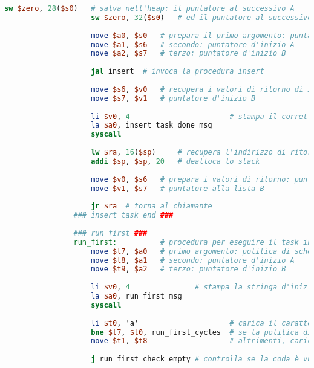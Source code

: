 \begin{center}
\begin{lstlisting}[language=mips, gobble=14, stepnumber=1]
                    sw $zero, 28($s0)	# salva nell'heap: il puntatore al successivo A
                    sw $zero, 32($s0)	# ed il puntatore al successivo B
                    
                    move $a0, $s0	# prepara il primo argomento: puntatore al task appena creato (da inserire)
                    move $a1, $s6	# secondo: puntatore d'inizio A
                    move $a2, $s7	# terzo: puntatore d'inizio B
                    
                    jal insert	# invoca la procedura insert
                    
                    move $s6, $v0	# recupera i valori di ritorno di insert: puntatore d'inizio A
                    move $s7, $v1	# puntatore d'inizio B
                
                    li $v0, 4						# stampa il corretto inserimento del task
                    la $a0, insert_task_done_msg
                    syscall
                    
                    lw $ra, 16($sp)		# recupera l'indirizzo di ritorno al chiamante
                    addi $sp, $sp, 20	# dealloca lo stack
                    
                    move $v0, $s6	# prepara i valori di ritorno: puntatore alla lista A
                    move $v1, $s7	# puntatore alla lista B
                    
                    jr $ra	# torna al chiamante
                ### insert_task end ###
                
                ### run_first ###
                run_first:			# procedura per eseguire il task in testa alla coda
                    move $t7, $a0	# primo argomento: politica di scheduling
                    move $t8, $a1	# secondo: puntatore d'inizio A
                    move $t9, $a2	# terzo: puntatore d'inizio B
                
                    li $v0, 4               # stampa la stringa d'inizio dell'esecuzione del primo task
                    la $a0, run_first_msg
                    syscall
                    
                    li $t0, 'a'						# carica il carattere 'a'
                    bne $t7, $t0, run_first_cycles	# se la politica di scheduling non è A,  passa all'inizializzazione per la politica B
                    move $t1, $t8					# altrimenti, carica il puntatore d'inizio di A
                    
                    j run_first_check_empty	# controlla se la coda è vuota
                    

\end{lstlisting}
\end{center}
